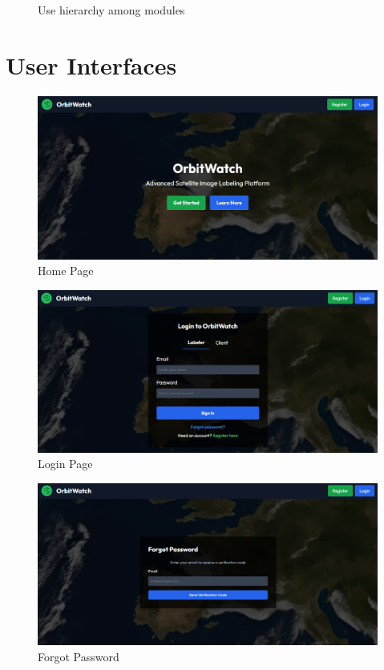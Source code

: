 \documentclass[12pt, titlepage]{article}
\begin{document}

\begin{figure}[H]
\centering
\caption{Use hierarchy among modules}
\label{FigUH}
\end{figure}


\section{User Interfaces}
\begin{figure}[H]
    \centering
    \includegraphics[width=\linewidth]{home.png}
    \caption{Home Page}
\end{figure}
\begin{figure}[H]
    \centering
    \includegraphics[width=\linewidth]{login.png}
    \caption{Login Page}
\end{figure}
\begin{figure}[H]
    \centering
    \includegraphics[width=\linewidth]{forgot_password.png}
    \caption{Forgot Password}
\end{figure}
\end{document}
